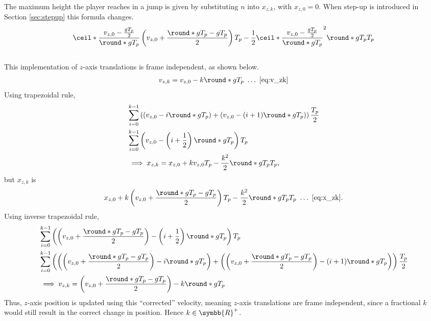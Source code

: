 The maximum height the player reaches in a jump is given by substituting $n$ into $x_{z,k}$, with $x_{z,0} = 0$.
When step-up is introduced in Section \ref{sec:stepup} this formula changes.
\begin{align}
\label{eq:max_jump_height}
\ceil*{\frac{v_{z,0} - \frac{gT_p}{2}}{\round*{gT_p}}}\left(v_{z,0} + \frac{\round*{gT_p} - gT_p}{2} \right) T_p - \frac{1}{2}\ceil*{\frac{v_{z,0} - \frac{gT_p}{2}}{\round*{gT_p}}}^2 \round*{gT_p} T_p
\end{align}
\\
This implementation of $z$-axis translations is frame independent, as shown below.
\begin{align*}
v_{z,k} = v_{z,0} - k\round*{gT_p}\ \ldots\ \eqref{eq:v_zk}
\end{align*}
Using trapezoidal rule,
\begin{align*}
&\sum_{i=0}^{k-1} \left(\left(v_{z,0} - i\round*{gT_p} \right) + \left(v_{z,0} - (i + 1) \round*{gT_p} \right)\right) \frac{T_p}{2}\\
&\sum_{i=0}^{k-1} \left(v_{z,0} - \left(i + \frac{1}{2} \right) \round*{gT_p} \right) T_p\\
&\implies x_{z,k} = x_{z,0} + k v_{z,0} T_p - \frac{k^2}{2}\round*{gT_p} T_p,
\end{align*}
but $x_{z,k}$ is
\begin{align*}
x_{z,0} + k\left(v_{z,0} + \frac{\round*{gT_p} - gT_p}{2} \right) T_p - \frac{k^2}{2}\round*{gT_p} T_p\ \ldots\ \eqref{eq:x_zk}.
\end{align*}
Using inverse trapezoidal rule,
\begin{align}
\nonumber
&\sum_{i=0}^{k-1} \left(\left(v_{z,0} + \frac{\round*{gT_p} - gT_p}{2} \right) - \left(i + \frac{1}{2} \right) \round*{gT_p} \right) T_p\\\nonumber
&\sum_{i=0}^{k-1} \left(\left(\left(v_{z,0} + \frac{\round*{gT_p} - gT_p}{2} \right) - i\round*{gT_p} \right) + \left(\left(v_{z,0} + \frac{\round*{gT_p} - gT_p}{2} \right) - (i + 1)\round*{gT_p} \right) \right) \frac{T_p}{2}\\
\label{eq:corrected_v_zk}
&\implies v_{z,k} = \left(v_{z,0} + \frac{\round*{gT_p} - gT_p}{2} \right) - k\round*{gT_p}
\end{align}
Thus, $z$-axis position is updated using this ``corrected'' velocity, meaning $z$-axis translations are frame independent, since a fractional $k$ would still result in the correct change in position. Hence $k \in \symbb{R}^+$.\\

